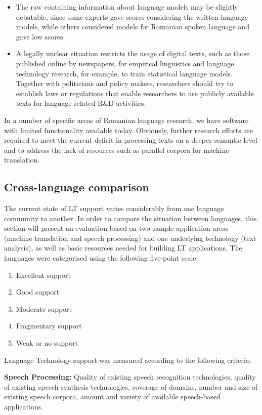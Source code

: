 \begin{multicols}{2}
\begin{itemize}
\item The raw containing information about language models may be slightly debatable, since some experts gave scores considering the written language models, while others considered models for Romanian spoken language and gave low scores.
\item A legally unclear situation restricts the usage of digital texts, such as those published online by newspapers, for empirical linguistics and language technology research, for example, to train statistical language models. Together with politicians and policy makers, researchers should try to establish laws or regulations that enable researchers to use publicly available texts for language-related R\&D activities.
\end{itemize}

In a number of specific areas of Romanian language research, we have software with limited functionality available today. Obviously, further research efforts are required to meet the current deficit in processing texts on a deeper semantic level and to address the lack of resources such as parallel corpora for machine translation.

\subsection{Cross-language comparison}
The current state of LT support varies considerably from one language community to another. In order to compare the situation between languages, this section will present an evaluation based on two sample application areas (machine translation and speech processing) and one underlying technology (text analysis), as well as basic resources needed for building LT applications. The languages were categorised using the following five-point scale: 

\begin{enumerate}
\item Excellent support
\item Good support
\item Moderate support
\item Fragmentary support
\item Weak or no support
\end{enumerate}

Language Technology support was measured according to the following criteria:

\textbf{Speech Processing:} Quality of existing speech recognition technologies, quality of existing speech synthesis technologies, coverage of domains, number and size of existing speech corpora, amount and variety of available speech-based applications.


\end{multicols}
